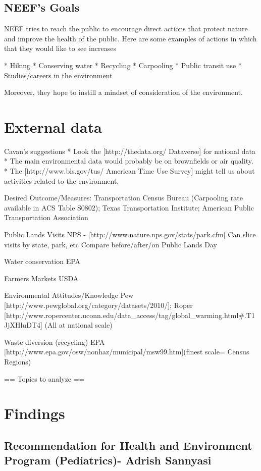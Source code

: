 \documentclass{article}
\begin{document}
\subsection{NEEF's Goals}
NEEF tries to reach the public to encourage direct actions that protect nature and improve the health of the public. Here are some examples of actions in which that they would like to see increases

* Hiking
* Conserving water
* Recycling
* Carpooling
* Public transit use
* Studies/careers in the environment

Moreover, they hope to instill a mindset of consideration of the environment.

\section{External data}
Cavan's suggestions
* Look the [http://thedata.org/ Dataverse] for national data
* The main environmental data would probably be on brownfields or air quality.
* The [http://www.bls.gov/tus/ American Time Use Survey] might tell us about activities related to the environment.


Desired Outcome/Measures:
Transportation
Census Bureau (Carpooling rate available in ACS Table S0802); Texas Transportation Institute; American Public Transportation Association
 
Public Lands Visits
 NPS - [http://www.nature.nps.gov/stats/park.cfm]
Can slice visits by state, park, etc
Compare before/after/on Public Lands Day


Water conservation
EPA
 
Farmers Markets
USDA
 
Environmental Attitudes/Knowledge
Pew [http://www.pewglobal.org/category/datasets/2010/]; Roper [http://www.ropercenter.uconn.edu/data_access/tag/global_warming.html#.T1JjXHluDT4] (All at national scale)
 
Waste diversion (recycling)
EPA [http://www.epa.gov/osw/nonhaz/municipal/msw99.htm](finest scale= Census Regions)

== Topics to analyze ==

\section{Findings}
\subsection{Recommendation for Health and Environment Program (Pediatrics)- Adrish Sannyasi}
\end{document}
